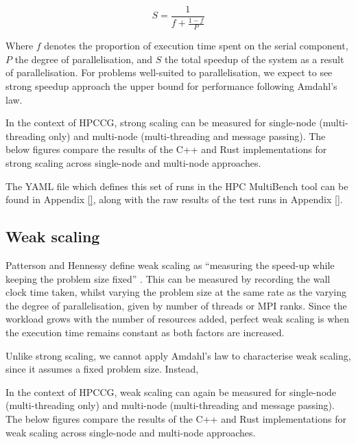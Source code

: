 \begin{equation}
    S = \frac{1}{f + \frac{1-f}{P}}
\end{equation}

Where $f$ denotes the proportion of execution time spent on the serial component, $P$ the degree of parallelisation, and $S$ the total speedup of the system as a result of parallelisation. For problems well-suited to parallelisation, we expect to see strong speedup approach the upper bound for performance following Amdahl's law.

In the context of HPCCG, strong scaling can be measured for single-node (multi-threading only) and multi-node (multi-threading and message passing). The below figures compare the results of the C++ and Rust implementations for strong scaling across single-node and multi-node approaches.




The YAML file which defines this set of runs in the HPC MultiBench tool can be found in Appendix  \ref{}, along with the raw results of the test runs in Appendix \ref{}.

\subsection{Weak scaling}
\label{ssec:weak-scaling}

Patterson and Hennessy define weak scaling as ``measuring the speed-up while keeping the problem size fixed'' \cite{pattersonHennessyComputerOrganisationArchitecture}. This can be measured by recording the wall clock time taken, whilst varying the problem size at the same rate as the varying the degree of parallelisation, given by number of threads or MPI ranks. Since the workload grows with the number of resources added, perfect weak scaling is when the execution time remains constant as both factors are increased.

Unlike strong scaling, we cannot apply Amdahl's law to characterise weak scaling, since it assumes a fixed problem size. Instead, 


In the context of HPCCG, weak scaling can again be measured for single-node (multi-threading only) and multi-node (multi-threading and message passing). The below figures compare the results of the C++ and Rust implementations for weak scaling across single-node and multi-node approaches.

